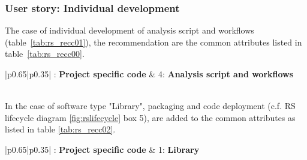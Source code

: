 \subsubsection{User story: Individual development}

The case of individual development of analysis script and workflows (table~\ref{tab:rs_recc01}), the recommendation are the common attributes listed in table~\ref{tab:rs_recc00}.

\begin{center}
    \tabletail{\hline}
    \label{tab:rs_recc01}
    \small
    \begin{supertabular}{|p{0.65\linewidth}|p{0.35\linewidth}|} : \textbf{Project specific code} &
    4: \textbf{Analysis script and workflows} \\ \hline \hline
     \\ \hline

\end{supertabular}
\end{center}

In the case of software type "Library", packaging and code deployment (c.f. RS lifecycle diagram \ref{fig:rslifecycle} box 5), are added to the common attributes as listed in table \ref{tab:rs_recc02}.

\begin{center}
    \tabletail{\hline}
    \label{tab:rs_recc02}
    \small
    \begin{supertabular}{|p{0.65\linewidth}|p{0.35\linewidth}|} : \textbf{Project specific code} &
    1: \textbf{Library} \\ \hline \hline

     \\ \hline
     \\ \hline
     \\ \hline

\end{supertabular}
\end{center}

